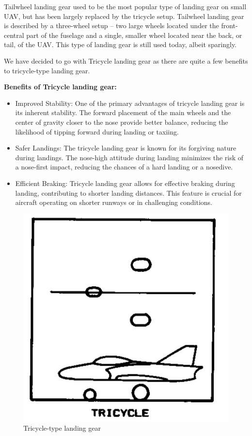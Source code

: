 \documentclass[12 pt]{article}
\begin{document}
{{\begin{enumerate}
Tailwheel landing gear used to be the most popular type of landing gear on small UAV, but has been largely replaced by the tricycle setup. Tailwheel landing gear is described by a three-wheel setup – two large wheels located under the front-central part of the fuselage and a single, smaller wheel located near the back, or tail, of the UAV. This type of landing gear is still used today, albeit sparingly.

\end{enumerate}
\newpage

We have decided to go with Tricycle landing gear as there are quite a few benefits to tricycle-type landing gear.\\
    
    \item\textbf{Benefits of Tricycle landing gear:}
    \begin{itemize}
    
\item Improved Stability: One of the primary advantages of tricycle landing gear is its inherent stability. The forward placement of the main wheels and the center of gravity closer to the nose provide better balance, reducing the likelihood of tipping forward during landing or taxiing.

\item Safer Landings: The tricycle landing gear is known for its forgiving nature during landings. The nose-high attitude during landing minimizes the risk of a nose-first impact, reducing the chances of a hard landing or a nosedive.

\item Efficient Braking: Tricycle landing gear allows for effective braking during landing, contributing to shorter landing distances. This feature is crucial for aircraft operating on shorter runways or in challenging conditions.
    \end{itemize}
    
    \begin{figure}[h]
        \centering
        \includegraphics[width=0.5\linewidth]{image.png}
        \caption{Tricycle-type landing gear}
        \label{fig:tricycle-landing-gear}
    \end{figure}

}}
\end{document}
